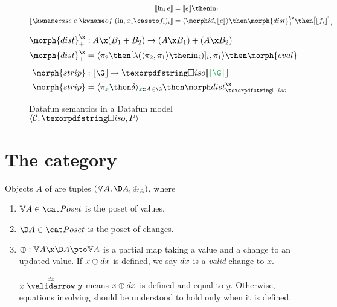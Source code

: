 \documentclass{rntz}\usepackage[a5]{rntzgeometry}\usepackage[fullwidth=130mm,width=330pt,]{narrow}
\begin{document}
\begin{figure*}
  \begin{align*}
    \den{\inj i e} &= \den{e} \then \injc_i
    \\
    \den{\ecase{e} (\inj i{x_i} \caseto f_i)_i} &=
    \fork{\id, \den{e}} \then \morph{dist}^\x_+ \then \bigkrof{\den{f_i}}_i
  \end{align*}

  \vspace{.5\baselineskip}

  \begin{align*}
    \morph{dist}^\x_+ &: A \x (B_1 + B_2) \to (A \x B_1) + (A \x B_2)\\
    \morph{dist}^\x_+ &= \fork{\pi_2 \then \krof{\lambda (\fork{\pi_2,\pi_1} \then \injc_i)}_i, \pi_1}
    \then \morph{eval}
    \\[1ex]
    \morph{strip} &: \den\G \to \discof{\den{\stripcxd\G}}\\
    \morph{strip} &= \fork{\pi_{\dvar x} \then \delta}_{\hd x A \in \G} \then \discox
  \end{align*}


  \caption{Datafun semantics in a Datafun model $\tuple{\catC, \disco, \pfin}$}
  \label{fig:general-semantics}
\end{figure*}


\section{The category \CP}
\label{sec:changeposets}

Objects $A$ of \CP{} are tuples $(\vals A, \chgs A, \updfn_A)$, where
%
\begin{enumerate}
\item $\vals A \in \Poset$ is the poset of values.

\item $\chgs A \in \Poset$ is the poset of changes.

\item $\updfn : \vals A \x \chgs A \pto \vals A$ is a partial map taking a value
  and a change to an updated value. If $x \mathbin{\oplus} dx$ is defined, we say $dx$ is a
  \emph{valid} change to $x$.

  $\vld{\dx} x y$ means $x \mathbin{\oplus} dx$ is defined and equal to $y$. Otherwise,
  equations inv\-olv\-ing \updfn{} should be understood to hold only when it is
  defined.
\end{enumerate}
\end{document}
